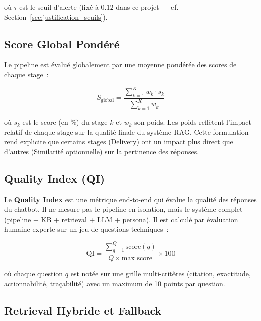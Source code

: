 où $\tau$ est le seuil d'alerte (fixé à $0.12$ dans ce projet --- cf. Section~\ref{sec:justification_seuils}).

\subsection{Score Global Pondéré}
\label{sec:def_score_global}

Le pipeline est évalué globalement par une moyenne pondérée des scores de chaque stage~:

\begin{equation}
S_{\text{global}} = \frac{\sum_{k=1}^{K} w_k \cdot s_k}{\sum_{k=1}^{K} w_k}
\label{eq:score_global_def}
\end{equation}

où $s_k$ est le score (en \%) du stage $k$ et $w_k$ son poids. Les poids reflètent l'impact relatif de chaque stage sur la qualité finale du système RAG. Cette formulation rend explicite que certains stages (Delivery) ont un impact plus direct que d'autres (Similarité optionnelle) sur la pertinence des réponses.

\subsection{Quality Index (QI)}
\label{sec:def_quality_index}

Le \textbf{Quality Index} est une métrique end-to-end qui évalue la qualité des réponses du chatbot. Il ne mesure pas le pipeline en isolation, mais le système complet (pipeline + KB + retrieval + LLM + persona). Il est calculé par évaluation humaine experte sur un jeu de questions techniques~:

\begin{equation}
\text{QI} = \frac{\sum_{q=1}^{Q} \text{score}(q)}{Q \times \text{max\_score}} \times 100
\label{eq:qi_def}
\end{equation}

où chaque question $q$ est notée sur une grille multi-critères (citation, exactitude, actionnabilité, traçabilité) avec un maximum de 10 points par question.

\subsection{Retrieval Hybride et Fallback}
\label{sec:def_retrieval_fallback}

